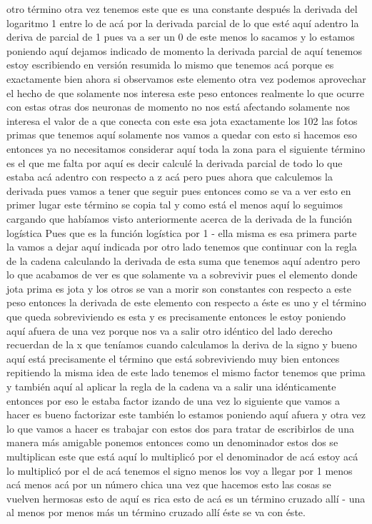 otro término otra vez tenemos este que es una constante después la derivada del logaritmo 1 entre lo de acá por la derivada parcial de lo que esté aquí adentro la deriva de parcial de 1 pues va a ser un 0 de este menos lo sacamos y lo estamos poniendo aquí dejamos indicado de momento la derivada parcial de aquí tenemos estoy escribiendo en versión resumida lo mismo que tenemos acá porque es exactamente bien ahora si observamos este elemento otra vez podemos aprovechar el hecho de que solamente nos interesa este peso entonces realmente lo que ocurre con estas otras dos neuronas de momento no nos está afectando solamente nos interesa el valor de a que conecta con este esa jota exactamente los 102 las fotos primas que tenemos aquí solamente nos vamos a quedar con esto si hacemos eso entonces ya no necesitamos considerar aquí toda la zona para el siguiente término es el que me falta por aquí es decir calculé la derivada parcial de todo lo que estaba acá adentro con respecto a z acá pero pues ahora que calculemos la derivada pues vamos a tener que seguir pues entonces como se va a ver esto en primer lugar este término se copia tal y como está el menos aquí lo seguimos cargando que habíamos visto anteriormente acerca de la derivada de la función logística 
Pues que es la función logística por 1 - ella misma es esa primera parte la vamos a dejar aquí indicada por otro lado tenemos que continuar con la regla de la cadena calculando la derivada de esta suma que tenemos aquí adentro pero lo que acabamos de ver es que solamente va a sobrevivir pues el elemento donde jota prima es jota y los otros se van a morir son constantes con respecto a este peso entonces la derivada de este elemento con respecto a éste es uno y el término que queda sobreviviendo es esta y es precisamente entonces le estoy poniendo aquí afuera de una vez porque nos va a salir otro idéntico del lado derecho recuerdan de la x que teníamos cuando calculamos la deriva de la signo y bueno aquí está precisamente el término que está sobreviviendo muy bien entonces repitiendo la misma idea de este lado tenemos el mismo factor tenemos que prima y también aquí al aplicar la regla de la cadena va a salir una idénticamente entonces por eso le estaba factor izando de una vez lo siguiente que vamos a hacer es bueno factorizar este también lo estamos poniendo aquí afuera y otra vez lo que vamos a hacer es trabajar con estos dos para tratar de escribirlos de una manera más amigable ponemos entonces como un denominador estos dos se multiplican este que está aquí lo multiplicó por el denominador de acá estoy acá lo multiplicó por el de acá tenemos el signo menos los voy a llegar por 1 menos acá menos acá por un número chica una vez que hacemos esto las cosas se vuelven hermosas esto de aquí es rica esto de acá es un término cruzado allí - una al menos por menos más un término cruzado allí éste se va con éste. 
